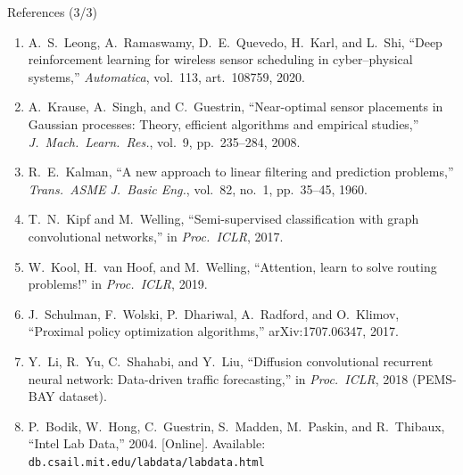 \documentclass[aspectratio=169,10pt,xcolor=table]{beamer}
\begin{document}
\begin{frame}{References (3/3)}
  \scriptsize
  \begin{enumerate}\setlength\itemsep{0.25em}
    \item[{[18]}] A.~S.~Leong, A.~Ramaswamy, D.~E.~Quevedo, H.~Karl, and L.~Shi, ``Deep reinforcement learning for wireless sensor scheduling in cyber--physical systems,'' \emph{Automatica}, vol.~113, art.~108759, 2020.
    \item[{[19]}] A.~Krause, A.~Singh, and C.~Guestrin, ``Near-optimal sensor placements in Gaussian processes: Theory, efficient algorithms and empirical studies,'' \emph{J.\ Mach.\ Learn.\ Res.}, vol.~9, pp.~235--284, 2008.
    \item[{[20]}] R.~E.~Kalman, ``A new approach to linear filtering and prediction problems,'' \emph{Trans.\ ASME J.\ Basic Eng.}, vol.~82, no.~1, pp.~35--45, 1960.
    \item[{[21]}] T.~N.~Kipf and M.~Welling, ``Semi-supervised classification with graph convolutional networks,'' in \emph{Proc.\ ICLR}, 2017.
    \item[{[22]}] W.~Kool, H.~van Hoof, and M.~Welling, ``Attention, learn to solve routing problems!'' in \emph{Proc.\ ICLR}, 2019.
    \item[{[23]}] J.~Schulman, F.~Wolski, P.~Dhariwal, A.~Radford, and O.~Klimov, ``Proximal policy optimization algorithms,'' arXiv:1707.06347, 2017.
    \item[{[24]}] Y.~Li, R.~Yu, C.~Shahabi, and Y.~Liu, ``Diffusion convolutional recurrent neural network: Data-driven traffic forecasting,'' in \emph{Proc.\ ICLR}, 2018 (PEMS-BAY dataset).
    \item[{[25]}] P.~Bodik, W.~Hong, C.~Guestrin, S.~Madden, M.~Paskin, and R.~Thibaux, ``Intel Lab Data,'' 2004. [Online]. Available: \texttt{db.csail.mit.edu/labdata/labdata.html}
  \end{enumerate}
\end{frame}
\end{document}

